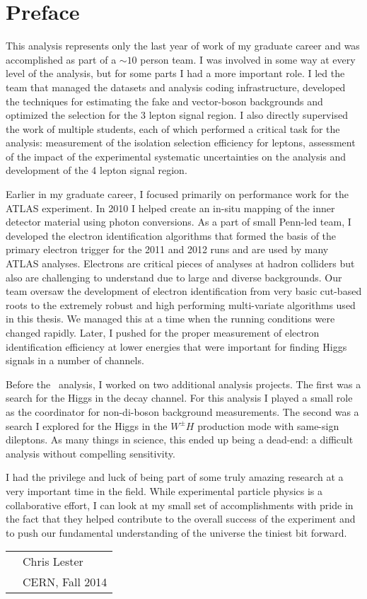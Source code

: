 \chapter*{Preface}

This analysis represents only the last year of work of my graduate career and was accomplished as part of
a $\sim10$ person team. I was involved in some way at every level 
of the analysis, but for some parts I had a more important role.
I led the team that managed the datasets and analysis coding infrastructure, developed the techniques
for estimating the fake and vector-boson backgrounds and optimized
the selection for the 3 lepton signal region. I also directly supervised the work of multiple students, 
each of which performed a critical task for the analysis: measurement of the isolation
selection efficiency for leptons, assessment of the impact of the experimental
systematic uncertainties on the analysis and development of the 4 lepton signal region. 

Earlier in my graduate career, I focused primarily on performance work for the ATLAS experiment.
In 2010 I helped create an in-situ mapping of the inner detector material using photon conversions.  
As a part of small Penn-led team, I developed the electron
identification algorithms that formed the basis of the primary electron trigger for the
2011 and 2012 runs and are used by many ATLAS analyses. Electrons are critical 
pieces of analyses at hadron colliders but also are challenging to understand
due to large and diverse backgrounds. Our team oversaw the development of electron identification
from very basic cut-based roots to the extremely robust and high performing
multi-variate algorithms used in this thesis. We managed this at a time
when the running conditions were changed rapidly. Later, I pushed for the proper
measurement of electron identification efficiency at lower energies that 
were important for finding Higgs signals in a number of channels.

Before the \tth\ analysis, I worked on two additional analysis projects. The first
was a search for the Higgs in the \WW decay channel. For this analysis
I played a small role as the coordinator for non-\WW di-boson background measurements.
The second was a search I explored for the Higgs in the $W^{\pm}H$ production
mode with same-sign dileptons. As many things in science, this ended up
being a dead-end: a difficult analysis without compelling sensitivity. 

I had the privilege and luck of being part of some truly amazing research at a very important
time in the field. While experimental particle physics is a collaborative effort,
I can look at my small set of accomplishments with pride in the fact that they helped 
contribute to the overall success of the experiment and to push our fundamental 
understanding of the universe the tiniest bit forward. 


\vspace{0.05\textheight}

\begin{tabular}{p{} l}
  & Chris Lester            \\
  & CERN, Fall 2014   \\
\end{tabular}

